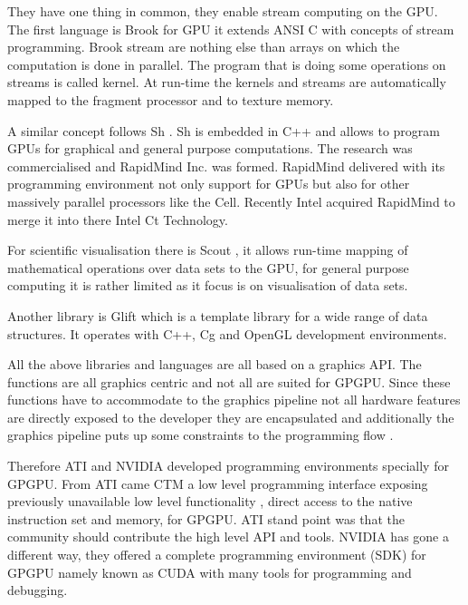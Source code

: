 They have one thing in common, they enable stream computing on the \gls{GPU}. The
first language is Brook\citep{Buck:2004} for \gls{GPU} it extends \gls{ANSI} C
with concepts of stream programming. Brook stream are nothing else than arrays
on which the computation is done in parallel. The program that is doing some
operations on streams is called kernel. At run-time the kernels and streams are
automatically mapped to the fragment processor and to texture memory. 

A similar concept follows Sh \citep{citeulike:6661860}. Sh is embedded in C++ 
and allows to program \glspl{GPU} for graphical and general purpose computations. 
The research was commercialised and RapidMind Inc. was formed. RapidMind delivered
with its programming environment not only support for \glspl{GPU} but also for
other massively parallel processors like the Cell. Recently Intel acquired RapidMind
to merge it into there Intel Ct Technology. 

For scientific visualisation there is Scout \citep{citeulike:3145428},
it allows run-time mapping  of mathematical operations over data sets to the 
\gls{GPU}, for general purpose computing it is rather limited as it focus is on
visualisation of data sets. 

Another library is Glift \citep{Lefohn:2006:GGE} which is a template library 
for a wide range of data structures. It operates with C++, Cg and OpenGL 
development environments. 

All the above libraries and languages are all based on a graphics \gls{API}.
The functions are all graphics centric and not all are suited for \gls{GPGPU}.
Since these functions have to accommodate to the graphics pipeline not all
hardware features are directly exposed to the developer they are encapsulated
and additionally the graphics pipeline puts up some constraints to the
programming flow \citep{citeulike:1187394}.

Therefore \gls{ATI} and \gls{NVIDIA} developed programming environments
specially for \gls{GPGPU}. From \gls{ATI} came \gls{CTM} a low level programming
interface exposing previously unavailable low level functionality , direct
access to the native instruction set and memory, for \gls{GPGPU}. \Gls{ATI}
stand point was that the community should contribute the high level \gls{API}
and tools. \Gls{NVIDIA} has gone a different way, they offered a complete
programming environment (\gls{SDK}) for \gls{GPGPU} namely known as \gls{CUDA}
\citep{citeulike:3839013} with many tools for programming and debugging. 

